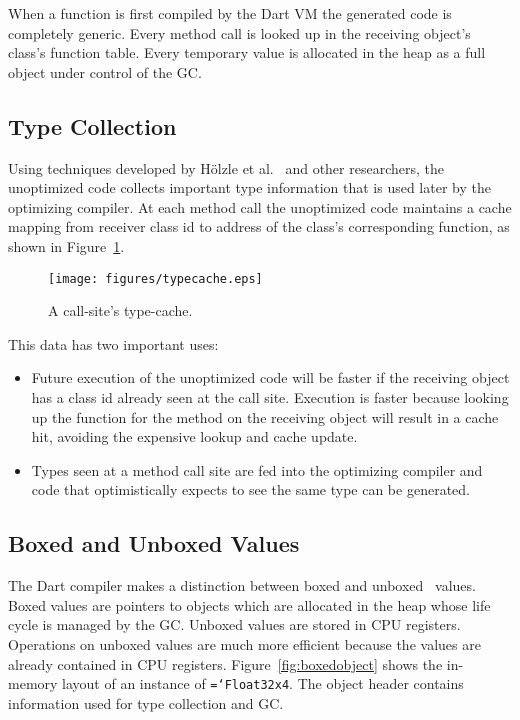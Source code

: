 \documentclass{sigplanconf}
\newcommand{\ttt}[1]{{\texttt{\hyphenchar\font=`\-\relax #1}}}%
\begin{document}
When a function is first compiled by the Dart VM the generated code is
completely generic. Every method call is looked up in the receiving object's
class's function table. Every temporary value is allocated in the heap as a full
object under control of the GC.

\subsection{Type Collection}

Using techniques developed by H\"{o}lzle et al.~\cite{typefeedback} and other
researchers, the unoptimized code collects important type information that is
used later by the optimizing compiler. At each method call the unoptimized code
maintains a cache mapping from receiver class id to address of the
class's corresponding function, as shown in Figure~\ref{fig:typecache}.

\begin{figure}
\begin{center}
\texttt{[image: figures/typecache.eps]}
\end{center}
\caption{A call-site's type-cache.}
\label{fig:typecache}
\end{figure}

This data has two important uses:
\begin{itemize}
\item
Future execution of the unoptimized code will be faster if the receiving object
has a class id already seen at the call site. Execution is faster because
looking up the function for the method on the receiving object will result in a
cache hit, avoiding the expensive lookup and cache update.

\item
Types seen at a method call site are fed into the optimizing compiler and code
that optimistically expects to see the same type can be generated.
\end{itemize}

\subsection{Boxed and Unboxed Values}
\label{boxing}

The Dart compiler makes a distinction between boxed and unboxed~\cite{unboxing}
values. Boxed values are pointers to objects which are allocated in the heap
whose life cycle is managed by the GC. Unboxed values are stored in CPU
registers. Operations on unboxed values are much more efficient because the
values are already contained in CPU registers. Figure~\ref{fig:boxedobject}
shows the in-memory layout of an instance of \ttt{Float32x4}. The object header
contains information used for type collection and GC.
\end{document}
